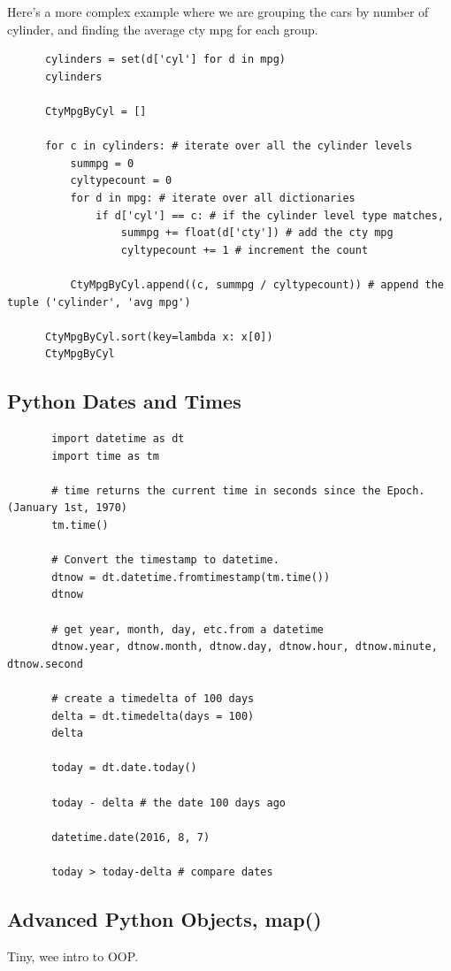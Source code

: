\documentclass[11pt]{article}
\begin{document}
    \noindent
    Here's a more complex example where we are grouping the cars by
    number of cylinder, and finding the average cty mpg for each group.
    \begin{lstlisting}
      cylinders = set(d['cyl'] for d in mpg)
      cylinders
      
      CtyMpgByCyl = []
      
      for c in cylinders: # iterate over all the cylinder levels
          summpg = 0
          cyltypecount = 0
          for d in mpg: # iterate over all dictionaries
              if d['cyl'] == c: # if the cylinder level type matches,
                  summpg += float(d['cty']) # add the cty mpg
                  cyltypecount += 1 # increment the count

          CtyMpgByCyl.append((c, summpg / cyltypecount)) # append the tuple ('cylinder', 'avg mpg')

      CtyMpgByCyl.sort(key=lambda x: x[0])
      CtyMpgByCyl
     \end{lstlisting}

    \subsection{Python Dates and Times}
     \begin{lstlisting}
       import datetime as dt
       import time as tm

       # time returns the current time in seconds since the Epoch. (January 1st, 1970)
       tm.time()
       
       # Convert the timestamp to datetime.
       dtnow = dt.datetime.fromtimestamp(tm.time())
       dtnow

       # get year, month, day, etc.from a datetime
       dtnow.year, dtnow.month, dtnow.day, dtnow.hour, dtnow.minute, dtnow.second 

       # create a timedelta of 100 days
       delta = dt.timedelta(days = 100)  
       delta

       today = dt.date.today()
       
       today - delta # the date 100 days ago

       datetime.date(2016, 8, 7)

       today > today-delta # compare dates
     \end{lstlisting}


    \newpage
    \subsection{Advanced Python Objects, map()}
    Tiny, wee intro to OOP. 
\end{document}
